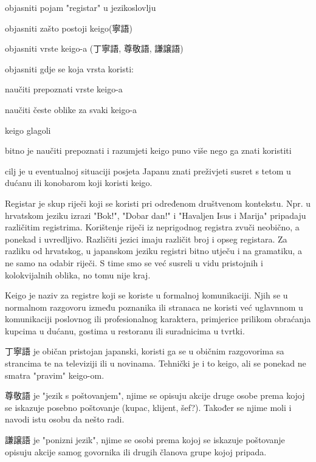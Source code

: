
\author{Ivan Petranović}

	
	
	\begin{hyou}
		\item objasniti pojam "registar" u jezikoslovlju
		\item objasniti zašto postoji keigo(寧語)
		\item objasniti vrste keigo-a (丁寧語, 尊敬語, 謙譲語)
		\item objasniti gdje se koja vrsta koristi:
		\item naučiti prepoznati vrste keigo-a
		\item naučiti česte oblike za svaki keigo-a
		\item keigo glagoli
	\end{hyou}

	
	\begin{hyou}
		\item bitno je naučiti prepoznati i razumjeti keigo puno više nego ga znati koristiti
		\item cilj je u eventualnoj situaciji posjeta Japanu znati preživjeti susret s tetom u dućanu ili konobarom koji koristi keigo.
	\end{hyou}

	
	Registar je skup riječi koji se koristi pri određenom društvenom kontekstu. Npr. u hrvatskom jeziku izrazi "Bok!", "Dobar dan!" i "Havaljen Isus i Marija" pripadaju različitim registrima. Korištenje riječi iz neprigodnog registra zvuči neobično, a ponekad i uvredljivo. Različiti jezici imaju različit broj i opseg registara. Za razliku od hrvatskog, u japanskom jeziku registri bitno utječu i na gramatiku, a ne samo na odabir riječi. S time smo se već susreli u vidu pristojnih i kolokvijalnih oblika, no tomu nije kraj.
	
	Keigo je naziv za registre koji se koriste u formalnoj komunikaciji. Njih se u normalnom razgovoru između poznanika ili stranaca ne koristi već uglavnnom u komunikaciji poslovnog ili profesionalnog karaktera, primjerice prilikom obraćanja kupcima u dućanu, gostima u restoranu ili suradnicima u tvrtki.
	
	丁寧語 je običan pristojan japanski, koristi ga se u običnim razgovorima sa strancima te na televiziji ili u novinama. Tehnički je i to keigo, ali se ponekad ne smatra "pravim" keigo-om.
	
	尊敬語 je "jezik s poštovanjem", njime se opisuju akcije druge osobe prema kojoj se iskazuje posebno poštovanje (kupac, klijent, šef?). Također se njime moli i navodi istu osobu da nešto radi.
	
	謙譲語 je "ponizni jezik", njime se osobi prema kojoj se iskazuje poštovanje opisuju akcije samog govornika ili drugih članova grupe kojoj pripada.
